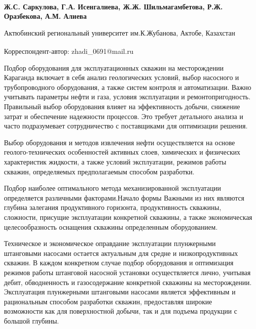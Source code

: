 
\begin{articleheader}

{\bfseries
Ж.С. Саркулова\textsuperscript{\envelope },
Г.А. Исенгалиева,
Ж.Ж. Шильмагамбетова,
Р.Ж. Оразбекова,
А.М. Алиева
}
\end{articleheader}

\begin{affiliation}
Актюбинский региональный университет им.К.Жубанова, Актобе, Казахстан

\raggedright \textsuperscript{\envelope } Корреспондент-автор: zhadi\_0691@mail.ru
\end{affiliation}

Подбор оборудования для эксплуатационных скважин на месторождении
Караганда включает в себя анализ геологических условий, выбор насосного
и трубопроводного оборудования, а также систем контроля и автоматизации.
Важно учитывать параметры нефти и газа, условия эксплуатации и
ремонтопригодность. Правильный выбор оборудования влияет на
эффективность добычи, снижение затрат и обеспечение надежности
процессов. Это требует детального анализа и часто подразумевает
сотрудничество с поставщиками для оптимизации решения.

Выбор оборудования и методов извлечения нефти осуществляется на основе
геолого-технических особенностей активных слоев, химических и физических
характеристик жидкости, а также условий эксплуатации, режимов работы
скважин, определяемых предполагаемым способом разработки.

Подбор наиболее оптимального метода механизированной эксплуатации
определяется различными факторами.Начало формы Важными из них являются
глубина залегания продуктивного горизонта, продуктивность скважины,
сложности, присущие эксплуатации конкретной скважины, а также
экономическая целесообразность оснащения скважины определенным
оборудованием.

Техническое и экономическое оправдание эксплуатации плунжерными
штанговыми насосами остается актуальным для средне и низкопродуктивных
скважин. В каждом конкретном случае подбор оборудования и оптимизация
режимов работы штанговой насосной установки осуществляется лично,
учитывая дебит, обводненность и газосодержание конкретной скважины на
месторождении. Эксплуатация плунжерными штанговыми насосами является
эффективным и рациональным способом разработки скважин, предоставляя
широкие возможности как для поверхностной добычи, так и для подъема
продукции с большой глубины.

